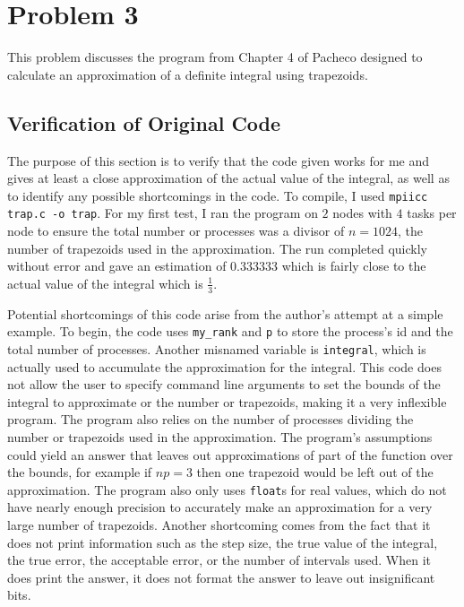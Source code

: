 \documentclass[11pt]{article}
\begin{document}
\section{Problem 3}
This problem discusses the program from Chapter 4 of Pacheco designed to calculate an approximation of a definite integral using trapezoids.
\subsection{Verification of Original Code}
The purpose of this section is to verify that the code given works for me and gives at least a close approximation of the actual value of the integral, as well as to identify any possible shortcomings in the code. To compile, I used \texttt{mpiicc trap.c -o trap}. For my first test, I ran the program on $2$ nodes with $4$ tasks per node to ensure the total number or processes was a divisor of $n=1024$, the number of trapezoids used in the approximation. The run completed quickly without error and gave an estimation of 0.333333 which is fairly close to the actual value of the integral which is $\frac{1}{3}$.

Potential shortcomings of this code arise from the author's attempt at a simple example. To begin, the code uses \texttt{my\_rank} and \texttt{p} to store the process's id and the total number of processes. Another misnamed variable is \texttt{integral}, which is actually used to accumulate the approximation for the integral. This code does not allow the user to specify command line arguments to set the bounds of the integral to approximate or the number or trapezoids, making it a very inflexible program. The program also relies on the number of processes dividing the number or trapezoids used in the approximation. The program's assumptions could yield an answer that leaves out approximations of part of the function over the bounds, for example if $np=3$ then one trapezoid would be left out of the approximation. The program also only uses \texttt{float}s for real values, which do not have nearly enough precision to accurately make an approximation for a very large number of trapezoids. Another shortcoming comes from the fact that it does not print information such as the step size, the true value of the integral, the true error, the acceptable error, or the number of intervals used. When it does print the answer, it does not format the answer to leave out insignificant bits.
\end{document}
